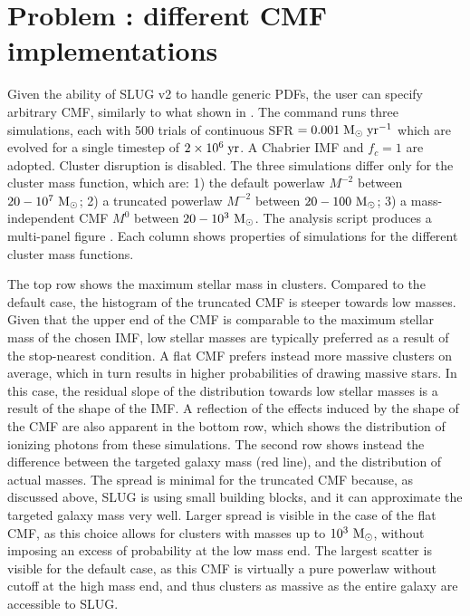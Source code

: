 \documentclass[letterpaper,10pt,english]{sphinxmanual}
\begin{document}
\section{Problem : different CMF implementations}
\label{\detokenize{tests:problem-cmfchoice-different-cmf-implementations}}
Given the ability of SLUG v2 to handle generic PDFs, the user can specify arbitrary CMF,
similarly to what shown in  {\hyperref[\detokenize{tests:probimf-label}]{}}.
The command   runs three  simulations, each with 500 trials
of continuous  SFR \(=0.001\rm\;M_\odot\;yr^{-1}\) which are evolved for a
single timestep of  \(2\times 10^6\rm\;yr\). A Chabrier IMF and \(f_c=1\)
are adopted. Cluster disruption is disabled. The three simulations
differ only for the cluster mass function, which are:
1) the default powerlaw \(M^{-2}\) between \(20-10^{7}~\rm M_\odot\);
2) a truncated powerlaw \(M^{-2}\) between \(20-100~\rm M_\odot\);
3) a mass-independent CMF \(M^{0}\) between \(20-10^3~\rm M_\odot\).
The analysis script  produces a multi-panel figure
. Each column shows properties of simulations for the different
cluster mass functions.

The top row shows the maximum stellar mass in clusters. Compared to the default case,
the histogram of the truncated CMF is steeper towards low masses. Given that the upper end of the
CMF is comparable to the maximum stellar mass of the chosen IMF, low stellar masses are typically
preferred  as a result of the stop-nearest condition. A flat CMF
prefers instead more massive clusters on average, which in turn results in higher probabilities
of drawing massive stars. In this case, the residual slope of the distribution towards
low stellar masses is a result of the shape of the IMF. A reflection of the effects induced by the
shape of the CMF are also apparent in the bottom row, which shows the distribution of
ionizing photons from these simulations. The second row shows instead the difference
between the targeted galaxy mass (red line), and the distribution of actual masses.
The spread is minimal for the truncated CMF because, as discussed above, SLUG is using
small building blocks, and it can approximate the targeted galaxy mass very well.
Larger spread is visible in the case of the flat CMF, as this choice allows for clusters with masses
up to \(10^3~\rm M_\odot\), without imposing an excess of probability at the low
mass end. The largest scatter is visible for the default case, as this CMF is virtually
a pure powerlaw without cutoff at the high mass end, and thus clusters as massive as the entire galaxy
are accessible to SLUG.
\end{document}
